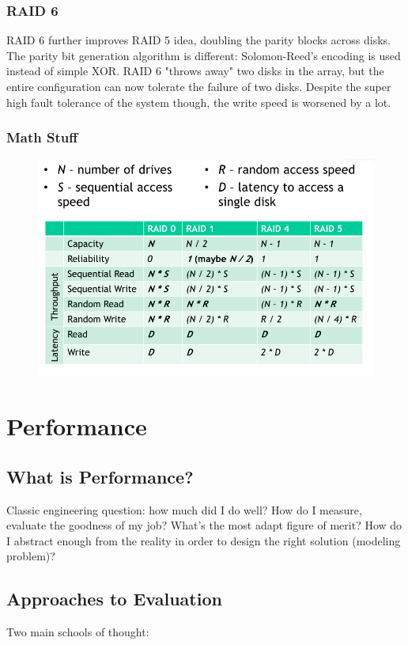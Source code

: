 \documentclass[10pt,a4paper]{article}
\begin{document}
				\subsubsection{RAID 6}
					RAID 6 further improves RAID 5 idea, doubling the parity blocks across disks. The parity bit generation algorithm is different: Solomon-Reed's encoding is used instead of simple XOR. RAID 6 "throws away" two disks in the array, but the entire configuration can now tolerate the failure of two disks. Despite the super high fault tolerance of the system though, the write speed is worsened by a lot.
					
				\subsubsection{Math Stuff}
					\begin{figure}[H]
						\centering
						\includegraphics[width = \textwidth]{./images/raids.png}
					\end{figure}
		
		\section{Performance}
			\subsection{What is Performance?}
				Classic engineering question: how much did I do well? How do I measure, evaluate the goodness of my job? What's the most adapt figure of merit? How do I abstract enough from the reality in order to design the right solution (modeling problem)?
				
			\subsection{Approaches to Evaluation}
				Two main schools of thought:
				
\end{document}
